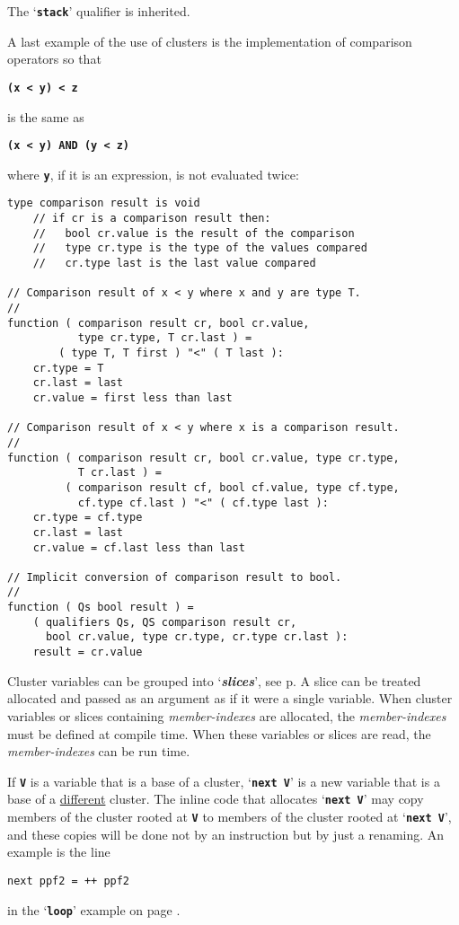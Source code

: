 \documentclass[12pt]{article}
\newcommand{\TT}[1]{{\tt \bfseries #1}}
\newcommand{\skey}[2]{{\bf \em #1#2}\index{#1}}
\newcommand{\pagref}[1]{p\pageref{#1}}
\newenvironment{indpar}[1][0.3in]%
	{\begin{list}{}%
		     {\setlength{\itemsep}{0in}%
		      \setlength{\topsep}{0in}%
		      \setlength{\parsep}{1ex}%
		      \setlength{\labelwidth}{#1}%
		      \setlength{\leftmargin}{#1}%
		      \addtolength{\leftmargin}{\labelsep}}%
	 \item}%
	{\end{list}}
\begin{document}
The `\TT{stack}' qualifier is inherited.

A last example of the use of clusters is the implementation of
comparison operators so that
\begin{center}
\TT{(x~<~y)~<~z}
\end{center}
is the same as
\begin{center}
\TT{(x~<~y) AND (y~<~z)}
\end{center}
where \TT{y}, if it is an expression,
is not evaluated twice:\label{COMPARISON-RESULTS}
\begin{indpar}\begin{verbatim}
type comparison result is void
    // if cr is a comparison result then:
    //   bool cr.value is the result of the comparison
    //   type cr.type is the type of the values compared
    //   cr.type last is the last value compared

// Comparison result of x < y where x and y are type T.
//
function ( comparison result cr, bool cr.value,
           type cr.type, T cr.last ) =
        ( type T, T first ) "<" ( T last ):
    cr.type = T
    cr.last = last
    cr.value = first less than last

// Comparison result of x < y where x is a comparison result.
//
function ( comparison result cr, bool cr.value, type cr.type,
           T cr.last ) =
         ( comparison result cf, bool cf.value, type cf.type,
           cf.type cf.last ) "<" ( cf.type last ):
    cr.type = cf.type
    cr.last = last
    cr.value = cf.last less than last

// Implicit conversion of comparison result to bool.
//
function ( Qs bool result ) =
    ( qualifiers Qs, QS comparison result cr,
      bool cr.value, type cr.type, cr.type cr.last ):
    result = cr.value
\end{verbatim}\end{indpar}

Cluster variables can be grouped into `\skey{slice}s', see
\pagref{SLICE}.  A slice can be treated allocated and passed
as an argument as if it were a single variable.  When cluster
variables or slices containing {\em member-indexes} are allocated,
the {\em member-indexes} must be defined at compile time.
When these variables or slices are read, the
{\em member-indexes} can be run time.

If \TT{V} is a variable that is a base of a cluster,
`\TT{next V}' is a new variable that is a base of a \underline{different}
cluster.  The inline code that allocates `\TT{next V}' may copy
members of the cluster rooted at \TT{V} to members of the cluster
rooted at `\TT{next V}', and these copies will be done not by an
instruction but by just a renaming.  An example is the line
\begin{indpar}\begin{verbatim}
next ppf2 = ++ ppf2
\end{verbatim}\end{indpar}
in the `\TT{loop}' example on page \pageref{NEXT-CLUSTER-BASE-EXAMPLE}.
\end{document}
